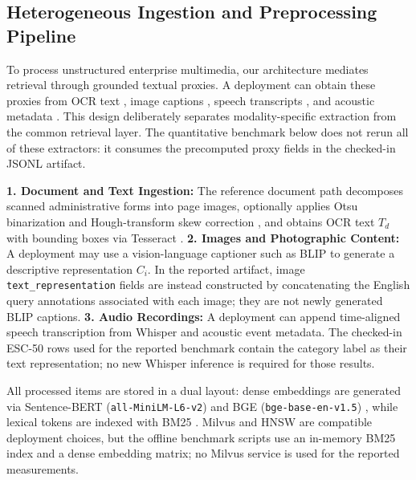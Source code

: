 \documentclass[conference]{IEEEtran}
\begin{document}
\subsection{Heterogeneous Ingestion and Preprocessing Pipeline}
To process unstructured enterprise multimedia, our architecture mediates retrieval through grounded textual proxies. A deployment can obtain these proxies from OCR text \cite{smith2007tesseract}, image captions \cite{li2022blip}, speech transcripts \cite{radford2023whisper}, and acoustic metadata \cite{piczak2015esc50}. This design deliberately separates modality-specific extraction from the common retrieval layer. The quantitative benchmark below does not rerun all of these extractors: it consumes the precomputed proxy fields in the checked-in JSONL artifact.

\textbf{1. Document and Text Ingestion:} The reference document path decomposes scanned administrative forms into page images, optionally applies Otsu binarization \cite{otsu1979} and Hough-transform skew correction \cite{hough1962, fateh2024ocr}, and obtains OCR text $T_d$ with bounding boxes via Tesseract \cite{smith2007tesseract}.
\textbf{2. Images and Photographic Content:} A deployment may use a vision-language captioner such as BLIP \cite{li2022blip} to generate a descriptive representation $C_i$. In the reported artifact, image \texttt{text\_representation} fields are instead constructed by concatenating the English query annotations associated with each image; they are not newly generated BLIP captions.
\textbf{3. Audio Recordings:} A deployment can append time-aligned speech transcription from Whisper \cite{radford2023whisper} and acoustic event metadata. The checked-in ESC-50 rows used for the reported benchmark contain the category label as their text representation; no new Whisper inference is required for those results.

All processed items are stored in a dual layout: dense embeddings are generated via Sentence-BERT (\texttt{all-MiniLM-L6-v2}) \cite{reimers2019sbert} and BGE (\texttt{bge-base-en-v1.5}) \cite{xiao2023bge}, while lexical tokens are indexed with BM25 \cite{robertson2009bm25, robertson1995okapi}. Milvus \cite{wang2021milvus} and HNSW \cite{malkov2020hnsw} are compatible deployment choices, but the offline benchmark scripts use an in-memory BM25 index and a dense embedding matrix; no Milvus service is used for the reported measurements.
\end{document}
